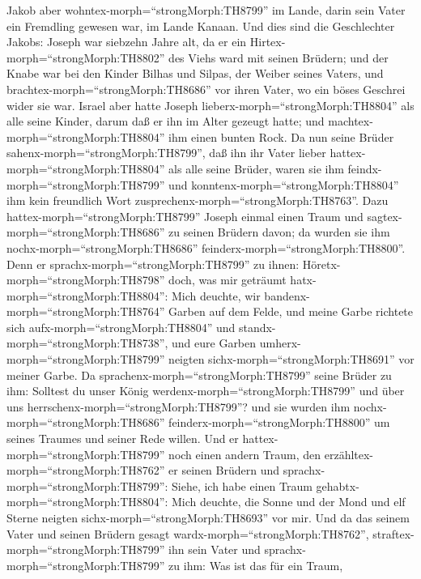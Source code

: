  Jakob aber wohntex-morph=``strongMorph:TH8799'' im Lande,
darin sein Vater ein Fremdling gewesen war, im Lande Kanaan.
 Und dies sind die Geschlechter Jakobs: Joseph war siebzehn
Jahre alt, da er ein Hirtex-morph=``strongMorph:TH8802'' des Viehs ward
mit seinen Brüdern; und der Knabe war bei den Kinder Bilhas und Silpas,
der Weiber seines Vaters, und brachtex-morph=``strongMorph:TH8686'' vor
ihren Vater, wo ein böses Geschrei wider sie war.  Israel
aber hatte Joseph lieberx-morph=``strongMorph:TH8804'' als alle seine
Kinder, darum daß er ihn im Alter gezeugt hatte; und
machtex-morph=``strongMorph:TH8804'' ihm einen bunten Rock. 
Da nun seine Brüder sahenx-morph=``strongMorph:TH8799'', daß ihn ihr
Vater lieber hattex-morph=``strongMorph:TH8804'' als alle seine Brüder,
waren sie ihm feindx-morph=``strongMorph:TH8799'' und
konntenx-morph=``strongMorph:TH8804'' ihm kein freundlich Wort
zusprechenx-morph=``strongMorph:TH8763''.  Dazu
hattex-morph=``strongMorph:TH8799'' Joseph einmal einen Traum und
sagtex-morph=``strongMorph:TH8686'' zu seinen Brüdern davon; da wurden
sie ihm nochx-morph=``strongMorph:TH8686''
feinderx-morph=``strongMorph:TH8800''.  Denn er
sprachx-morph=``strongMorph:TH8799'' zu ihnen:
Höretx-morph=``strongMorph:TH8798'' doch, was mir geträumt
hatx-morph=``strongMorph:TH8804'':  Mich deuchte, wir
bandenx-morph=``strongMorph:TH8764'' Garben auf dem Felde, und meine
Garbe richtete sich aufx-morph=``strongMorph:TH8804'' und
standx-morph=``strongMorph:TH8738'', und eure Garben
umherx-morph=``strongMorph:TH8799'' neigten
sichx-morph=``strongMorph:TH8691'' vor meiner Garbe.  Da
sprachenx-morph=``strongMorph:TH8799'' seine Brüder zu ihm: Solltest du
unser König werdenx-morph=``strongMorph:TH8799'' und über uns
herrschenx-morph=``strongMorph:TH8799''? und sie wurden ihm
nochx-morph=``strongMorph:TH8686'' feinderx-morph=``strongMorph:TH8800''
um seines Traumes und seiner Rede willen.  Und er
hattex-morph=``strongMorph:TH8799'' noch einen andern Traum, den
erzähltex-morph=``strongMorph:TH8762'' er seinen Brüdern und
sprachx-morph=``strongMorph:TH8799'': Siehe, ich habe einen Traum
gehabtx-morph=``strongMorph:TH8804'': Mich deuchte, die Sonne und der
Mond und elf Sterne neigten sichx-morph=``strongMorph:TH8693'' vor mir.
 Und da das seinem Vater und seinen Brüdern gesagt
wardx-morph=``strongMorph:TH8762'',
straftex-morph=``strongMorph:TH8799'' ihn sein Vater und
sprachx-morph=``strongMorph:TH8799'' zu ihm: Was ist das für ein Traum,
